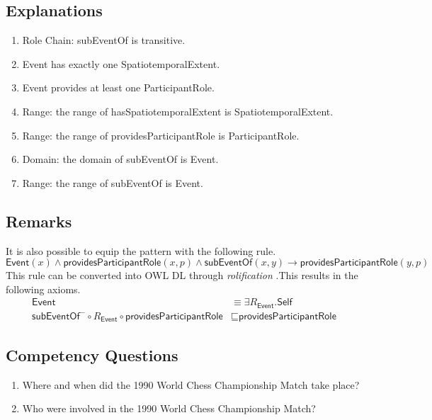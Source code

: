\subsection{Explanations}
\label{exp:Event}
\begin{enumerate}
\item Role Chain: \textsf{subEventOf} is transitive.
\item \textsf{Event} has exactly one \textsf{SpatiotemporalExtent}. 
\item \textsf{Event} provides at least one \textsf{ParticipantRole}.
\item Range: the range of \textsf{hasSpatiotemporalExtent} is \textsf{SpatiotemporalExtent}.
\item Range: the range of \textsf{providesParticipantRole} is \textsf{ParticipantRole}.
\item Domain: the domain of \textsf{subEventOf} is \textsf{Event}.
\item Range: the range of \textsf{subEventOf} is \textsf{Event}.
\end{enumerate}

\subsection{Remarks}
\label{rem:Event}
It is also possible to equip the pattern with the following rule.
\begin{equation}
\textsf{Event}(x) \wedge \textsf{providesParticipantRole}(x,p) \wedge \textsf{subEventOf}(x,y) \rightarrow \textsf{providesParticipantRole}(y,p)
\end{equation}
This rule can be converted into OWL DL through \emph{rolification} \cite{KrisnadhiMH11}.This results in the following axioms.
\begin{align}
\textsf{Event} &\equiv \exists R_\textsf{Event}.\textsf{Self} \\
\textsf{subEventOf}^- \circ R_\textsf{Event} \circ \textsf{providesParticipantRole} &\sqsubseteq \textsf{providesParticipantRole}
\end{align} 
\subsection{Competency Questions}
\label{cqs:Event}
\begin{enumerate}[CQ1.]
\item Where and when did the 1990 World Chess Championship Match take place?
\item Who were involved in the 1990 World Chess Championship Match?
\end{enumerate}
\newpage
